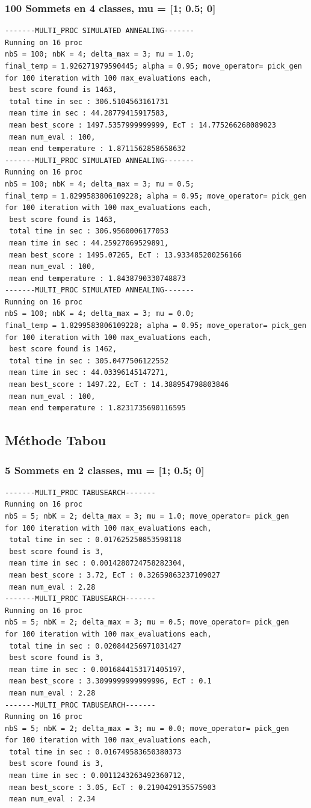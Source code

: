 \documentclass[a4paper]{article}
\begin{document}
\subsubsection{100 Sommets en 4 classes, mu = [1; 0.5; 0]}
\begin{verbatim}
-------MULTI_PROC SIMULATED ANNEALING-------
Running on 16 proc
nbS = 100; nbK = 4; delta_max = 3; mu = 1.0;
final_temp = 1.926271979590445; alpha = 0.95; move_operator= pick_gen
for 100 iteration with 100 max_evaluations each, 
 best score found is 1463,
 total time in sec : 306.5104563161731
 mean time in sec : 44.28779415917583,
 mean best_score : 1497.5357999999999, EcT : 14.775266268089023
 mean num_eval : 100,
 mean end temperature : 1.8711562858658632
-------MULTI_PROC SIMULATED ANNEALING-------
Running on 16 proc
nbS = 100; nbK = 4; delta_max = 3; mu = 0.5;
final_temp = 1.8299583806109228; alpha = 0.95; move_operator= pick_gen
for 100 iteration with 100 max_evaluations each, 
 best score found is 1463,
 total time in sec : 306.9560006177053
 mean time in sec : 44.25927069529891,
 mean best_score : 1495.07265, EcT : 13.933485200256166
 mean num_eval : 100,
 mean end temperature : 1.8438790330748873
-------MULTI_PROC SIMULATED ANNEALING-------
Running on 16 proc
nbS = 100; nbK = 4; delta_max = 3; mu = 0.0;
final_temp = 1.8299583806109228; alpha = 0.95; move_operator= pick_gen
for 100 iteration with 100 max_evaluations each, 
 best score found is 1462,
 total time in sec : 305.0477506122552
 mean time in sec : 44.03396145147271,
 mean best_score : 1497.22, EcT : 14.388954798803846
 mean num_eval : 100,
 mean end temperature : 1.8231735690116595
\end{verbatim}

\subsection{Méthode Tabou}
\subsubsection{5 Sommets en 2 classes, mu = [1; 0.5; 0]}
\begin{verbatim}
-------MULTI_PROC TABUSEARCH-------
Running on 16 proc
nbS = 5; nbK = 2; delta_max = 3; mu = 1.0; move_operator= pick_gen
for 100 iteration with 100 max_evaluations each, 
 total time in sec : 0.017625250853598118
 best score found is 3,
 mean time in sec : 0.0014280724758282304,
 mean best_score : 3.72, EcT : 0.32659863237109027
 mean num_eval : 2.28
-------MULTI_PROC TABUSEARCH-------
Running on 16 proc
nbS = 5; nbK = 2; delta_max = 3; mu = 0.5; move_operator= pick_gen
for 100 iteration with 100 max_evaluations each, 
 total time in sec : 0.020844256971031427
 best score found is 3,
 mean time in sec : 0.0016844153171405197,
 mean best_score : 3.3099999999999996, EcT : 0.1
 mean num_eval : 2.28
-------MULTI_PROC TABUSEARCH-------
Running on 16 proc
nbS = 5; nbK = 2; delta_max = 3; mu = 0.0; move_operator= pick_gen
for 100 iteration with 100 max_evaluations each, 
 total time in sec : 0.016749583650380373
 best score found is 3,
 mean time in sec : 0.0011243263492360712,
 mean best_score : 3.05, EcT : 0.2190429135575903
 mean num_eval : 2.34
\end{verbatim}
\end{document}
